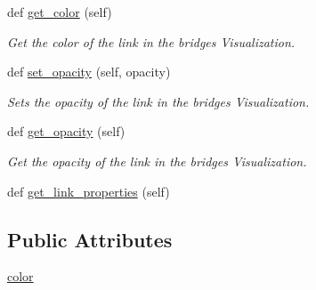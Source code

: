 \begin{DoxyCompactItemize}
def \mbox{\hyperlink{class_bridges_1_1link__visualizer_1_1_link_visualizer_af3b061f20b383565b99b9b80d4901a60}{get\+\_\+color}} (self)
\begin{DoxyCompactList}\small\item\em Get the color of the link in the bridges Visualization. \end{DoxyCompactList}\item 
def \mbox{\hyperlink{class_bridges_1_1link__visualizer_1_1_link_visualizer_a46cb7057831aba1a5cd25d49552629e5}{set\+\_\+opacity}} (self, opacity)
\begin{DoxyCompactList}\small\item\em Sets the opacity of the link in the bridges Visualization. \end{DoxyCompactList}\item 
def \mbox{\hyperlink{class_bridges_1_1link__visualizer_1_1_link_visualizer_ad9623595bcbe1da3a19368a89d3bc7cb}{get\+\_\+opacity}} (self)
\begin{DoxyCompactList}\small\item\em Get the opacity of the link in the bridges Visualization. \end{DoxyCompactList}\item 
def \mbox{\hyperlink{class_bridges_1_1link__visualizer_1_1_link_visualizer_a3ea7e9b8eda72169ca2819a84cb5faa7}{get\+\_\+link\+\_\+properties}} (self)
\end{DoxyCompactItemize}
\subsection*{Public Attributes}
\begin{DoxyCompactItemize}
\item 
\mbox{\hyperlink{class_bridges_1_1link__visualizer_1_1_link_visualizer_a66caf26ee75f2f33f650e76a40c72488}{color}}
\end{DoxyCompactItemize}
